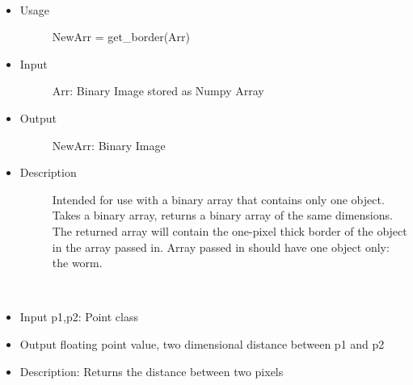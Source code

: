 \documentclass[letterpaper,10pt,oneside]{sphinxmanual}
\begin{document}
\begin{fulllineitems}
\label{index:libcelegans.get_border}~\begin{itemize}
\item {} \begin{description}
\item[{Usage}] \leavevmode
NewArr = get\_border(Arr)

\end{description}

\item {} \begin{description}
\item[{Input }] \leavevmode
Arr: Binary Image stored as Numpy Array

\end{description}

\item {} \begin{description}
\item[{Output}] \leavevmode
NewArr: Binary Image

\end{description}

\item {} \begin{description}
\item[{Description}] \leavevmode
Intended for use with a binary array that contains only one object.
Takes a binary array, returns a binary array of the same dimensions.  
The returned array will contain the one-pixel thick border of the
object in the array passed in.  Array passed in should have one object
only:  the worm.

\end{description}

\end{itemize}

\end{fulllineitems}


\begin{fulllineitems}
\label{index:libcelegans.get_distance}~\begin{itemize}
\item {} 
Input p1,p2: Point class

\item {} 
Output floating point value, two dimensional distance between p1 and p2

\item {} 
Description: Returns the distance between two pixels

\end{itemize}

\end{fulllineitems}
\end{document}

